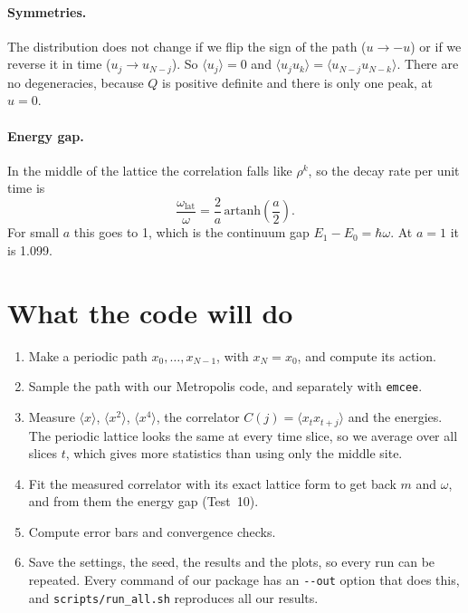 \documentclass[11pt]{article}
\begin{document}
\paragraph{Symmetries.} The distribution does not change if we flip the sign of the path ($u \to -u$) or if we reverse it in time ($u_j \to u_{N-j}$). So $\langle u_j\rangle = 0$ and $\langle u_j u_k\rangle = \langle u_{N-j}u_{N-k}\rangle$. There are no degeneracies, because $Q$ is positive definite and there is only one peak, at $u = 0$.

\paragraph{Energy gap.} In the middle of the lattice the correlation falls like $\rho^k$, so the decay rate per unit time is
\begin{equation}
  \frac{\omega_{\text{lat}}}{\omega} = \frac{2}{a}\,\mathrm{artanh}\!\left(\frac a2\right).
  \label{eq:wlat}
\end{equation}
For small $a$ this goes to 1, which is the continuum gap $E_1 - E_0 = \hbar\omega$. At $a = 1$ it is 1.099.

\section{What the code will do}
\begin{enumerate}
  \item Make a periodic path $x_0, \dots, x_{N-1}$, with $x_N = x_0$, and compute its action.
  \item Sample the path with our Metropolis code, and separately with \texttt{emcee}.
  \item Measure $\langle x\rangle$, $\langle x^2\rangle$, $\langle x^4\rangle$, the correlator $C(j) = \langle x_t x_{t+j}\rangle$ and the energies. The periodic lattice looks the same at every time slice, so we average over all slices $t$, which gives more statistics than using only the middle site.
  \item Fit the measured correlator with its exact lattice form to get back $m$ and $\omega$, and from them the energy gap (Test~10).
  \item Compute error bars and convergence checks.
  \item Save the settings, the seed, the results and the plots, so every run can be repeated. Every command of our package has an \texttt{-{}-out} option that does this, and \texttt{scripts/run\_all.sh} reproduces all our results.
\end{enumerate}
\end{document}
